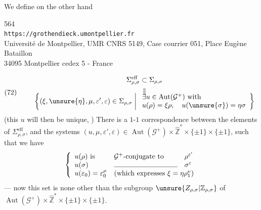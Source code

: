 We define on the other hand


{\small
\begin{center}
564\\
\texttt{https://grothendieck.umontpellier.fr}\\
Université de Montpellier, UMR CNRS 5149, Case courrier 051, Place Eugène Bataillon\\
34095 Montpellier cedex 5 - France
\end{center}
}


\[
\text{(72)}\qquad
\begin{gathered}
\Sigma_{\rho,\sigma}^{\mathrm{eff}}\subset\Sigma_{\rho,\sigma}\\
\begin{array}{c}
\Vert\\[-0.4em]
\displaystyle\left\{(\xi,\unsure{\eta},\mu,\varepsilon',\varepsilon)\in\Sigma_{\rho,\sigma}\;\middle|\;
\begin{array}{l}
\exists u\in\operatorname{Aut}(\mathcal{G}^{+})\ \text{with}\\
u(\rho)=\xi\rho,\quad u(\unsure{\sigma})=\eta\sigma
\end{array}\right\}
\end{array}
\end{gathered}
\]
(this $u$ will then be unique, ) There is a $1$-$1$ correspondence between the elements of $\Sigma_{\rho,\sigma}^{\mathrm{eff}}$, and the systems $(u,\mu,\varepsilon',\varepsilon)\in\operatorname{Aut}(\mathcal{G}^{+})\times\widehat{\mathbb Z}^{*}\times\{\pm1\}\times\{\pm1\}$, such that we have 
\[
\left\{\begin{array}{lll}
u(\rho)\text{ is}&\mathcal{G}^{+}\text{-conjugate to}&\rho^{\varepsilon'}\\
u(\sigma)&\rule{9em}{0.35pt}&\sigma^{\varepsilon}\\
u(\varepsilon_{0})=\varepsilon_{0}^{\mu}&\multicolumn{2}{l}{(\text{which expresses }\xi=\eta\rho_{1}^{\nu})}
\end{array}\right.
\]
--- now this set is none other than the subgroup $\unsure{Z_{\rho,\sigma}|\mathbb Z_{\rho,\sigma}}$ of $\operatorname{Aut}(\mathcal{G}^{+})\times\widehat{\mathbb Z}^{*}\times\{\pm1\}\times\{\pm1\}$. 

